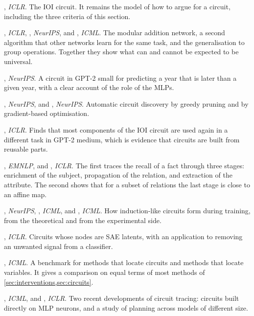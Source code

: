 \begin{readinglist}
\item \citet{wang2023interpretability}, \emph{ICLR}. The IOI circuit. It remains the model of how to argue for a
circuit, including the three criteria of this section.
\item \citet{nanda2023progress}, \emph{ICLR}, \citet{zhong2023clock}, \emph{NeurIPS}, and
\citet{chughtai2023toy}, \emph{ICML}. The modular addition network, a second algorithm that other networks learn
for the same task, and the generalisation to group operations. Together they show what can and cannot be expected
to be universal.
\item \citet{hanna2023how}, \emph{NeurIPS}. A circuit in GPT-2 small for predicting a year that is later than a given
year, with a clear account of the role of the MLPs.
\item \citet{conmy2023towards}, \emph{NeurIPS}, and \citet{bhaskar2024finding}, \emph{NeurIPS}. Automatic circuit
discovery by greedy pruning and by gradient-based optimisation.
\item \citet{merullo2024circuit}, \emph{ICLR}. Finds that most components of the IOI circuit are used again in a
different task in GPT-2 medium, which is evidence that circuits are built from reusable parts.
\item \citet{geva2023dissecting}, \emph{EMNLP}, and \citet{hernandez2024linearity}, \emph{ICLR}. The first traces
the recall of a fact through three stages: enrichment of the subject, propagation of the relation, and extraction
of the attribute. The second shows that for a subset of relations the last stage is close to an affine map.
\item \citet{bietti2023birth}, \emph{NeurIPS}, \citet{nichani2024transformers}, \emph{ICML}, and
\citet{singh2024needs}, \emph{ICML}. How induction-like circuits form during training, from the theoretical and
from the experimental side.
\item \citet{marks2025sparse}, \emph{ICLR}. Circuits whose nodes are SAE latents, with an application to removing
an unwanted signal from a classifier.
\item \citet{mueller2025mib}, \emph{ICML}. A benchmark for methods that locate circuits and methods that locate
variables. It gives a comparison on equal terms of most methods of \cref{sec:interventions,sec:circuits}.
\item \citet{arora2026language}, \emph{ICML}, and \citet{hanna2026latent}, \emph{ICLR}. Two recent developments of
circuit tracing: circuits built directly on MLP neurons, and a study of planning across models of different
size.
\end{readinglist}
